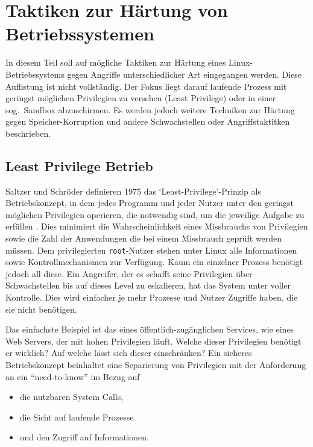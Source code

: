 
\chapter{Taktiken zur Härtung von Betriebssystemen}


In diesem Teil soll auf mögliche Taktiken zur Härtung eines Linux-Betriebssystems gegen Angriffe unterschiedlicher Art eingegangen werden. Diese Auflistung ist nicht vollständig. Der Fokus liegt darauf laufende Prozess mit geringst möglichen Privilegien zu versehen (Least Privilege) oder in einer sog.\ Sandbox abzuschirmen. Es werden jedoch weitere Techniken zur Härtung gegen Speicher-Korruption und andere Schwachstellen oder Angriffstaktitken beschrieben.

\section{Least Privilege Betrieb}

Saltzer und Schröder definieren 1975 das `Least-Privilege'-Prinzip als Betriebskonzept, in dem jedes Programm und jeder Nutzer unter den geringst möglichen Privilegien operieren, die notwendig sind, um die jeweilige Aufgabe zu erfüllen \cite{saltzer_1975}. Dies minimiert die Wahrscheinlichkeit eines Missbrauchs von Privilegien sowie die Zahl der Anwendungen die bei einem Missbrauch geprüft werden müssen. 
Dem privilegierten \texttt{root}-Nutzer stehen unter Linux alle Informationen sowie Kontrollmechanismen zur Verfügung. Kaum ein einzelner Prozess benötigt jedoch all diese. Ein Angreifer, der es schafft seine Privilegien über Schwachstellen bis auf dieses Level zu eskalieren, hat das System unter voller Kontrolle. Dies wird einfacher je mehr Prozesse und Nutzer Zugriffe haben, die sie nicht benötigen.

Das einfachste Beispiel ist das eines öffentlich-zugänglichen Services, wie eines Web Servers, der mit hohen Privilegien läuft. Welche dieser Privilegien benötigt er wirklich? Auf welche lässt sich dieser einschränken?
Ein sicheres Betriebskonzept beinhaltet eine Separierung von Privilegien mit der Anforderung an ein ``need-to-know'' im Bezug auf 
\begin{itemize}
  \item die nutzbaren System Calls,
  \item die Sicht auf laufende Prozesse
  \item und den Zugriff auf Informationen.
\end{itemize}


